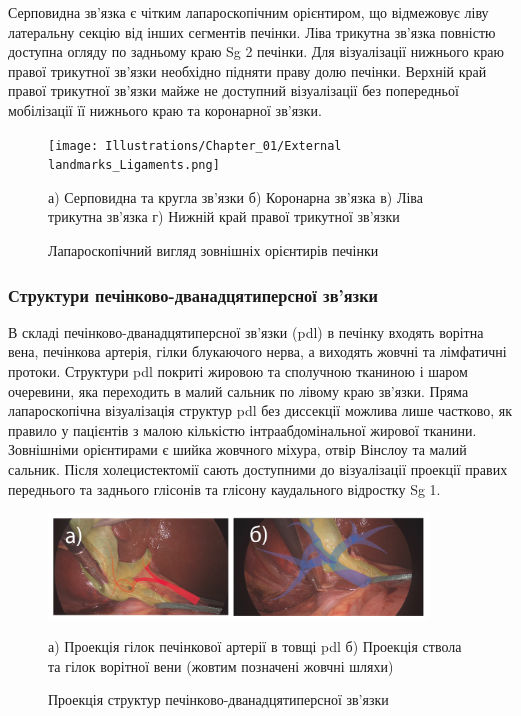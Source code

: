 Серповидна зв'язка є чітким лапароскопічним орієнтиром, що відмежовує ліву латеральну секцію від інших сегментів печінки. Ліва трикутна зв'язка повністю доступна огляду по задньому краю Sg 2 печінки. Для візуалізації нижнього краю правої трикутної зв'язки необхідно підняти праву долю печінки. Верхній край правої трикутної зв'язки майже не доступний візуалізації без попередньої мобілізації її нижнього краю та коронарної зв'язки. 

\begin{figure}[h]
\caption{Лапароскопічний вигляд зовнішніх орієнтирів печінки}

\texttt{[image: Illustrations/Chapter\_01/External landmarks\_Ligaments.png]}
\label{fig:External_landmarks_Ligaments}

\small
а) Серповидна та кругла зв'язки б) Коронарна зв'язка в) Ліва трикутна зв'язка г) Нижній край правої трикутної зв'язки
\end{figure}



\subsubsection{Структури печінково-дванадцятиперсної зв'язки}

В складі печінково-дванадцятиперсної зв'язки (\acrshort{pdl}) в печінку входять ворітна вена, печінкова артерія, гілки блукаючого нерва, а виходять жовчні та лімфатичні протоки. Структури \acrshort{pdl} покриті жировою та сполучною тканиною і шаром очеревини, яка переходить в малий сальник по лівому краю зв'язки. Пряма лапароскопічна візуалізація структур \acrshort{pdl} без диссекції можлива лише частково, як правило у пацієнтів з малою кількістю інтраабдомінальної жирової тканини. Зовнішніми орієнтирами є шийка жовчного міхура, отвір Вінслоу та малий сальник. Після холецистектомії сають доступними до візуалізації проекції правих переднього та заднього глісонів та глісону каудального відростку Sg 1. 

\begin{figure}[h]
\caption{Проекція структур печінково-дванадцятиперсної зв'язки}

\includegraphics[width=0.9\textwidth]{Illustrations/Chapter_01/External landmarks_PDL.png}
\label{fig:External_landmarks_PDL}

\small
а) Проекція гілок печінкової артерії в товщі \acrshort{pdl} б) Проекція ствола та гілок ворітної вени (жовтим позначені жовчні шляхи)
\end{figure}


